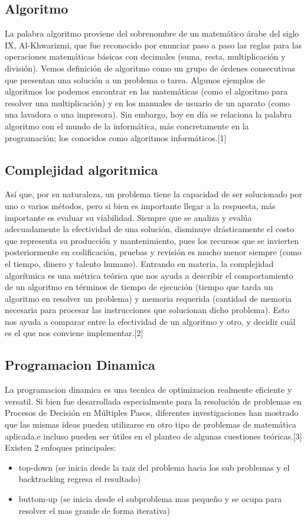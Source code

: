 \documentclass[spanish]{article}
\begin{document}
	\subsection{Algoritmo}
	La palabra algoritmo proviene del sobrenombre de un matemático árabe del siglo IX, Al-Khwarizmi, que fue reconocido por enunciar paso a paso las reglas para las operaciones matemáticas básicas con decimales (suma, resta, multiplicación y división).	
	Vemos definición de algoritmo como un grupo de órdenes consecutivas que presentan una solución a un problema o tarea. Algunos ejemplos de algoritmos los podemos encontrar en las matemáticas (como el algoritmo para resolver una multiplicación) y en los manuales de usuario de un aparato (como una lavadora o una impresora).	
	Sin embargo, hoy en día se relaciona la palabra algoritmo con el mundo de la informática, más concretamente en la programación; los conocidos como algoritmos informáticos.[1]	
	\subsection{Complejidad algoritmica}
	Así que, por su naturaleza, un problema tiene la capacidad de ser solucionado por uno o varios métodos, pero si bien es importante llegar a la respuesta, más importante es evaluar su viabilidad. Siempre que se analiza y evalúa adecuadamente la efectividad de una solución, disminuye drásticamente el costo que representa su producción y mantenimiento, pues los recursos que se invierten posteriormente en codificación, pruebas y revisión es mucho menor siempre (como el tiempo, dinero y talento humano).	
	Entrando en materia, la complejidad algorítmica es una métrica teórica que nos ayuda a describir el comportamiento de un algoritmo en términos de tiempo de ejecución (tiempo que tarda un algoritmo en resolver un problema) y memoria requerida (cantidad de memoria necesaria para procesar las instrucciones que solucionan dicho problema). Esto nos ayuda a comparar entre la efectividad de un algoritmo y otro, y decidir cuál es el que nos conviene implementar.[2]
	\subsection{Programacion Dinamica}
	La programacion dinamica es una tecnica de optimizacion realmente eficiente y versatil. Si bien fue desarrollada especialmente para la resolución de problemas en Procesos de Decisión en Múltiples Pasos, diferentes investigaciones han mostrado que las mismas ideas pueden utilizarse en otro tipo de problemas de matemática aplicada,e incluso pueden ser útiles en el planteo de algunas cuestiones teóricas.[3]
	Existen 2 enfoques principales:
	\begin{itemize}
		\item top-down (se inicia desde la raiz del problema hacia los sub problemas y el backtracking regresa el resultado)
		\item buttom-up (se inicia desde el subproblema mas pequeño y se ocupa para resolver el mas grande de forma iterativa)
	\end{itemize}
\end{document}
